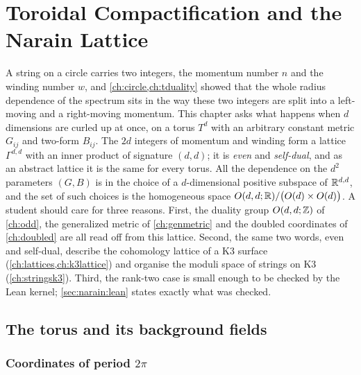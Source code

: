 \chapter{Toroidal Compactification and the Narain Lattice}\label{ch:narain}

A string on a circle carries two integers, the momentum number $n$ and the winding number
$w$, and \cref{ch:circle,ch:tduality} showed that the whole radius dependence of the spectrum
sits in the way these two integers are split into a left-moving and a right-moving momentum.
This chapter asks what happens when $d$ dimensions are curled up at once, on a torus $T^d$
with an arbitrary constant metric $G_{ij}$ and two-form $B_{ij}$. The $2d$ integers of
momentum and winding form a lattice $\Gamma^{d,d}$ with an inner product of signature $(d,d)$;
it is \emph{even} and \emph{self-dual}, and as an abstract lattice it is the same for every
torus. All the dependence on the $d^2$ parameters $(G,B)$ is in the choice of a
$d$-dimensional positive subspace of $\mathbb{R}^{d,d}$, and the set of such choices is the
homogeneous space $O(d,d;\mathbb{R})/\big(O(d)\times O(d)\big)$. A student should care for three
reasons. First, the duality group $O(d,d;\mathbb{Z})$ of \cref{ch:odd}, the generalized metric of
\cref{ch:genmetric} and the doubled coordinates of \cref{ch:doubled} are all read off from
this lattice. Second, the same two words, even and self-dual, describe the cohomology lattice
of a K3 surface (\cref{ch:lattices,ch:k3lattice}) and organise the moduli space of strings on
K3 (\cref{ch:stringsk3}). Third, the rank-two case is small enough to be checked by the Lean
kernel; \cref{sec:narain:lean} states exactly what was checked.

\section{The torus and its background fields}\label{sec:narain:torus}

\subsection{Coordinates of period \texorpdfstring{$2\pi$}{2 pi}}

